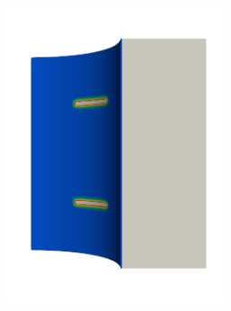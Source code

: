 \begin{frame}
\begin{columns}[T]
\begin{column}{0.6\textwidth}
\begin{figure}
{\begin{subfigure}{0.3\textwidth}
          \end{subfigure}
          \begin{subfigure}{0.3\textwidth}
            \centering
            \includegraphics[width=0.7\textwidth]{examples/figures/seed_d_1}
          \end{subfigure}
        }
        

\end{figure}
\end{column}
\end{columns}
\end{frame}
